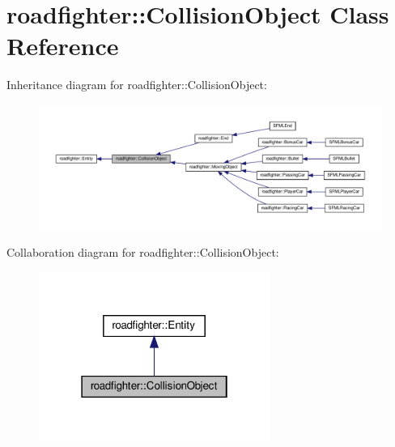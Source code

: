 \hypertarget{classroadfighter_1_1CollisionObject}{}\section{roadfighter\+:\+:Collision\+Object Class Reference}
\label{classroadfighter_1_1CollisionObject}


Inheritance diagram for roadfighter\+:\+:Collision\+Object\+:\nopagebreak
\begin{figure}[H]
\begin{center}
\leavevmode
\includegraphics[width=350pt]{classroadfighter_1_1CollisionObject__inherit__graph}
\end{center}
\end{figure}


Collaboration diagram for roadfighter\+:\+:Collision\+Object\+:\nopagebreak
\begin{figure}[H]
\begin{center}
\leavevmode
\includegraphics[width=214pt]{classroadfighter_1_1CollisionObject__coll__graph}
\end{center}
\end{figure}
